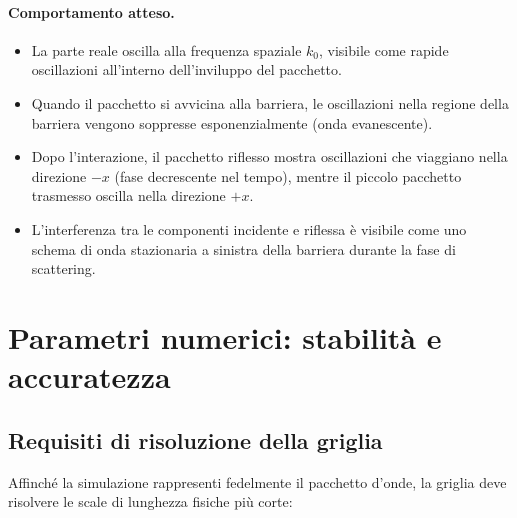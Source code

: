 \documentclass[12pt, a4paper]{article}
\begin{document}
\paragraph{Comportamento atteso.}
\begin{itemize}
  \item La parte reale oscilla alla frequenza spaziale $k_0$, visibile come
        rapide oscillazioni all'interno dell'inviluppo del pacchetto.
  \item Quando il pacchetto si avvicina alla barriera, le oscillazioni nella
        regione della barriera vengono soppresse esponenzialmente (onda evanescente).
  \item Dopo l'interazione, il pacchetto riflesso mostra oscillazioni che
        viaggiano nella direzione $-x$ (fase decrescente nel tempo), mentre
        il piccolo pacchetto trasmesso oscilla nella direzione $+x$.
  \item L'interferenza tra le componenti incidente e riflessa è visibile
        come uno schema di onda stazionaria a sinistra della barriera durante
        la fase di scattering.
\end{itemize}

\section{Parametri numerici: stabilità e accuratezza}

\subsection{Requisiti di risoluzione della griglia}

Affinché la simulazione rappresenti fedelmente il pacchetto d'onde, la
griglia deve risolvere le scale di lunghezza fisiche più corte:
\end{document}
